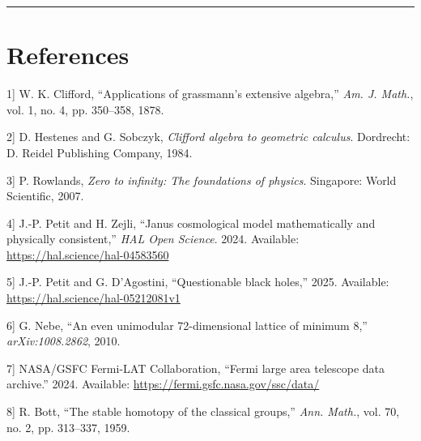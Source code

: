 \documentclass[11pt]{article}
\newlength{\cslhangindent}
\newenvironment{CSLReferences}[2]%
{\par
\noindent\setlength{\parindent}{0pt}}%
{\par}
\newcommand{\CSLLeftMargin}[1]{\hspace*{\cslhangindent}#1}
\newcommand{\CSLRightInline}[1]{#1}
\begin{document}
\begin{center}\rule{0.5\linewidth}{0.5pt}\end{center}

\hypertarget{references}{%
\section{References}\label{references}}

\hypertarget{refs}{}
\begin{CSLReferences}{0}{0}
\leavevmode{}%
\CSLLeftMargin{{[}1{]} }
\CSLRightInline{W. K. Clifford, {``Applications of grassmann's extensive
algebra,''} \emph{Am. J. Math.}, vol. 1, no. 4, pp. 350--358, 1878.}

\leavevmode{}%
\CSLLeftMargin{{[}2{]} }
\CSLRightInline{D. Hestenes and G. Sobczyk, \emph{Clifford algebra to
geometric calculus}. Dordrecht: D. Reidel Publishing Company, 1984.}

\leavevmode{}%
\CSLLeftMargin{{[}3{]} }
\CSLRightInline{P. Rowlands, \emph{Zero to infinity: The foundations of
physics}. Singapore: World Scientific, 2007.}

\leavevmode{}%
\CSLLeftMargin{{[}4{]} }
\CSLRightInline{J.-P. Petit and H. Zejli, {``Janus cosmological model
mathematically and physically consistent,''} \emph{HAL Open Science}.
2024. Available: \url{https://hal.science/hal-04583560}}

\leavevmode{}%
\CSLLeftMargin{{[}5{]} }
\CSLRightInline{J.-P. Petit and G. D'Agostini, {``Questionable black
holes,''} 2025. Available: \url{https://hal.science/hal-05212081v1}}

\leavevmode{}%
\CSLLeftMargin{{[}6{]} }
\CSLRightInline{G. Nebe, {``An even unimodular 72-dimensional lattice of
minimum 8,''} \emph{arXiv:1008.2862}, 2010.}

\leavevmode{}%
\CSLLeftMargin{{[}7{]} }
\CSLRightInline{NASA/GSFC Fermi-LAT Collaboration, {``Fermi large area
telescope data archive.''} 2024. Available:
\url{https://fermi.gsfc.nasa.gov/ssc/data/}}

\leavevmode{}%
\CSLLeftMargin{{[}8{]} }
\CSLRightInline{R. Bott, {``The stable homotopy of the classical
groups,''} \emph{Ann. Math.}, vol. 70, no. 2, pp. 313--337, 1959.}


\end{CSLReferences}
\end{document}
